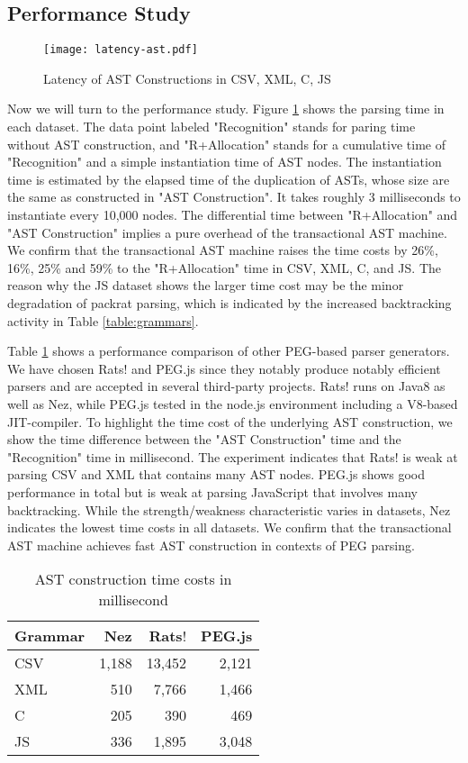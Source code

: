 \documentclass[JIP]{ipsj}
\begin{document}
\subsection{Performance Study}

\begin{figure}[tb]
\texttt{[image: latency-ast.pdf]}
\caption{Latency of AST Constructions in CSV, XML, C, JS}
\label{fig:latency}
\end{figure}

Now we will turn to the performance study. 
Figure \ref{fig:latency} shows the parsing time in each dataset. The data point labeled "Recognition" stands for paring time without AST construction, and "R+Allocation" stands for a cumulative time of "Recognition" and a simple instantiation time of AST nodes. The instantiation time is estimated by the elapsed time of the duplication of ASTs, whose size are the same as constructed in "AST Construction". It takes roughly 3 milliseconds to instantiate every 10,000 nodes. The differential time between "R+Allocation" and "AST Construction" implies a pure overhead of the transactional AST machine. We confirm that the transactional AST machine raises the time costs by 26\%, 16\%, 25\% and 59\% to the "R+Allocation" time in CSV, XML, C, and JS. The reason why the JS dataset shows the larger time cost may be the minor degradation of packrat parsing, which is indicated by the increased backtracking activity in Table \ref{table:grammars}.  

Table \ref {table:pegs} shows a performance comparison of other PEG-based parser generators. We have chosen Rats$!$ and PEG.js since they notably produce notably efficient parsers and are accepted in several third-party projects. Rats$!$ runs on Java8 as well as Nez, while PEG.js tested in the node.js environment including a V8-based JIT-compiler. To highlight the time cost of the underlying AST construction, we show the time difference between the "AST Construction" time and the "Recognition" time in millisecond. The experiment indicates that Rats$!$ is weak at parsing CSV and XML that contains many AST nodes. PEG.js shows good performance in total but is weak at parsing JavaScript that involves many backtracking. While the strength/weakness characteristic varies in datasets, Nez indicates the lowest time costs in all datasets. We confirm that the transactional AST machine achieves fast AST construction in contexts of PEG parsing. 

\begin{table}
\caption{AST construction time costs in millisecond  }
\label{table:pegs}
\begin{center}
\begin{tabular}{l|rrr} \hline
Grammar & Nez & Rats$!$ & PEG.js \\ \hline
CSV & 1,188 & 13,452 & 2,121 \\ 
XML & 510 & 7,766 & 1,466 \\
C & 205 & 390 & 469 \\
JS & 336 & 1,895 & 3,048 \\ \hline
\end{tabular}
\end{center}
\end{table}
\end{document}
